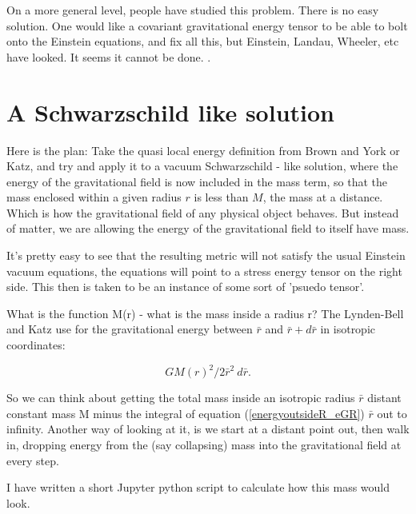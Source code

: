 \documentclass[../rzero]{subfiles}
\begin{document}
On a more general level, people have studied this problem. There is no easy solution. One would like a covariant gravitational energy tensor to be able to bolt onto the Einstein equations, and fix all this, but Einstein, Landau, Wheeler, etc have looked. It seems it cannot be done.  \cite{08092323EnergyMomentumGravitational}. 


\section{A Schwarzschild like solution} 
Here is the plan: Take the quasi local energy definition from Brown and York\cite{Brown1993} or Katz\cite{Katz2005}, and try and apply it to a vacuum Schwarzschild - like solution, where the energy of the gravitational field is now included in the mass term, so that the mass enclosed within a given radius $r$ is less than $M$, the mass at a distance. Which is how the gravitational field of any physical object behaves. But instead of matter, we are allowing the energy of the gravitational field to itself have mass. 

It's pretty easy to see that the resulting metric will not satisfy the usual Einstein vacuum equations, the equations will point to a stress energy tensor on the right side. This then is taken to be an instance of some sort of 'psuedo tensor'. 

What is the function M(r) - what is the mass inside a radius r? 
The Lynden-Bell and Katz\cite{lyndenbell1985} use for the gravitational energy between  $\bar r$ and $\bar r + d \bar r$ in isotropic coordinates: 

\begin{equation} \label{energyoutsideR_eGR}
 GM(r)^2/2 \bar r^2 \ d \bar r.
\end{equation}

So we can think about getting the total mass inside an isotropic radius $\bar r$ distant constant mass M minus the integral of equation (\ref{energyoutsideR_eGR}) $\bar r$ out to infinity. Another way of looking at it, is we start at a distant point out, then walk in, dropping energy from the (say collapsing) mass into the gravitational field at every step. 

I have written a short Jupyter python script to calculate how this mass would look. 
\end{document}

